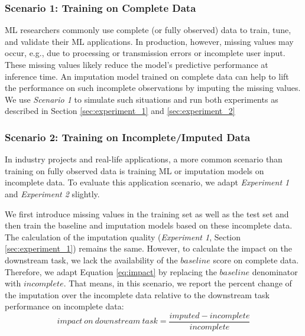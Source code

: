 \subsubsection{Scenario 1: Training on Complete Data}
\label{sec:scenario_1}
%
ML researchers commonly use complete (or fully observed) data to train, tune, and validate their ML applications. In production, however, missing values may occur, e.g., due to processing or transmission errors or incomplete user input. These missing values likely reduce the model's predictive performance at inference time. An imputation model trained on complete data can help to lift the performance on such incomplete observations by imputing the missing values. We use \emph{Scenario 1} to simulate such situations and run both experiments as described in Section \ref{sec:experiment_1} and \ref{sec:experiment_2}


\subsubsection{Scenario 2: Training on Incomplete/Imputed Data}
\label{sec:scenario_2}
%
In industry projects and real-life applications, a more common scenario than training on fully observed data is training ML or imputation models on incomplete data. To evaluate this application scenario, we adapt \emph{Experiment 1} and \emph{Experiment 2} slightly.

We first introduce missing values in the training set as well as the test set and then train the baseline and imputation models based on these incomplete data. The calculation of the imputation quality (\emph{Experiment 1}, Section \ref{sec:experiment_1}) remains the same. However, to calculate the impact on the downstream task, we lack the availability of the $baseline$ score on complete data. Therefore, we adapt Equation \ref{eq:impact} by replacing the $baseline$ denominator with $incomplete$. That means, in this scenario, we report the percent change of the imputation over the incomplete data relative to the downstream task performance on incomplete data:
%
\begin{equation}
	impact\ on \ downstream\ task = \frac{imputed - incomplete}{incomplete}
	\label{eq:impact_scenario2}
\end{equation}
%
